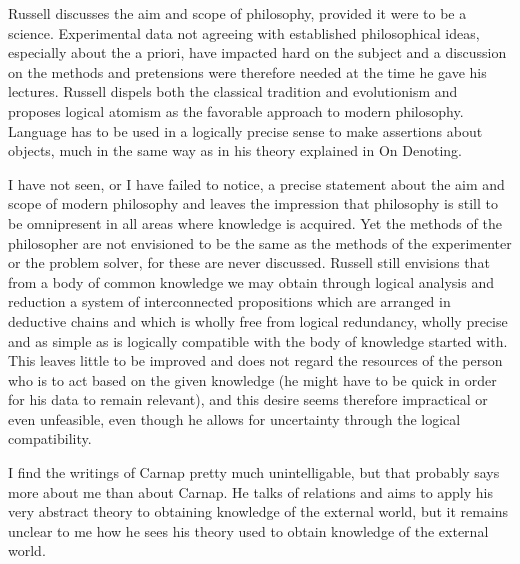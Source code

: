 \documentclass{article}
\begin{document}
\maketitle

Russell discusses the aim and scope of philosophy, provided it were to be a science. Experimental data not agreeing with established philosophical ideas, especially about the a priori, have impacted hard on the subject and a discussion on the methods and pretensions were therefore needed at the time he gave his lectures. Russell dispels both the classical tradition and evolutionism and proposes logical atomism as the favorable approach to modern philosophy. Language has to be used in a logically precise sense to make assertions about objects, much in the same way as in his theory explained in On Denoting. 

I have not seen, or I have failed to notice, a precise statement about the aim and scope of modern philosophy and leaves the impression that philosophy is still to be omnipresent in all areas where knowledge is acquired. Yet the methods of the philosopher are not envisioned to be the same as the methods of the experimenter or the problem solver, for these are never discussed. Russell still envisions that from a body of common knowledge we may obtain through logical analysis and reduction a system of interconnected propositions which are arranged in deductive chains and which is wholly free from logical redundancy, wholly precise and as simple as is logically compatible with the body of knowledge started with. This leaves little to be improved and does not regard the resources of the person who is to act based on the given knowledge (he might have to be quick in order for his data to remain relevant), and this desire seems therefore impractical or even unfeasible, even though he allows for uncertainty through the logical compatibility. 

I find the writings of Carnap pretty much unintelligable, but that probably says more about me than about Carnap. He talks of relations and aims to apply his very abstract theory to obtaining knowledge of the external world, but it remains unclear to me how he sees his theory used to obtain knowledge of the external world.
\end{document}
